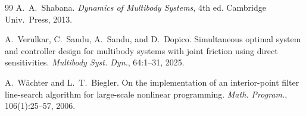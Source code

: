 \documentclass[12pt,a4paper]{article}
\theoremstyle{definition}
\theoremstyle{plain}
\begin{document}
\begin{thebibliography}{99}
A.\ A.\ Shabana.
\textit{Dynamics of Multibody Systems}, 4th ed.
Cambridge Univ.\ Press, 2013.

A.\ Verulkar, C.\ Sandu, A.\ Sandu, and D.\ Dopico.
Simultaneous optimal system and controller design for multibody systems with joint friction using direct sensitivities.
\textit{Multibody Syst. Dyn.}, 64:1--31, 2025.

A.\ W\"{a}chter and L.\ T.\ Biegler.
On the implementation of an interior-point filter line-search algorithm for large-scale nonlinear programming.
\textit{Math. Program.}, 106(1):25--57, 2006.

\end{thebibliography}
\end{document}
